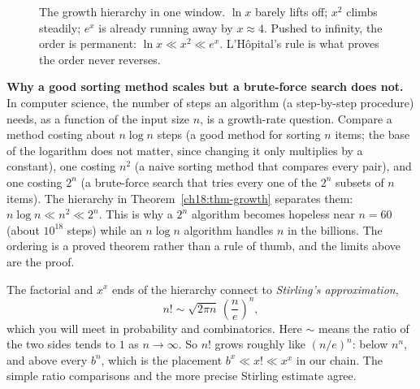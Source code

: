 \begin{figure}[H]
\centering
{}
\caption{The growth hierarchy in one window. $\ln x$ barely lifts off; $x^2$ climbs
steadily; $e^x$ is already running away by $x\approx 4$. Pushed to infinity, the order
is permanent: $\ln x\ll x^2\ll e^x$. L'H\^opital's rule is what proves the order never
reverses.}
\label{ch18:fig-growth}
\end{figure}

\begin{applicationbox}
\textbf{Why a good sorting method scales but a brute-force search does not.} In
computer science, the number of steps an algorithm (a step-by-step procedure) needs,
as a function of the input size $n$, is a growth-rate question. Compare a method costing
about $n\log n$ steps (a good method for sorting $n$ items; the base of the
logarithm does not matter, since changing it only multiplies by a constant), one
costing $n^2$ (a
naive sorting method that compares every pair), and one costing $2^n$ (a brute-force
search that tries every one of the $2^n$ subsets of $n$ items). The hierarchy in
Theorem~\ref{ch18:thm-growth} separates them:
$n\log n\ll n^2\ll 2^n$. This is why a
$2^n$ algorithm becomes hopeless near $n=60$ (about $10^{18}$ steps) while an $n\log n$
algorithm handles $n$ in the billions. The ordering is a proved theorem rather than a
rule of thumb, and the limits above are the proof.
\end{applicationbox}

\begin{connectionbox}
The factorial and $x^x$ ends of the hierarchy connect to \emph{Stirling's
approximation},
\[
n!\sim \sqrt{2\pi n}\,\left(\frac{n}{e}\right)^{n},
\]
which you will meet in probability and combinatorics. Here $\sim$ means the ratio of
the two sides tends to $1$ as $n\to\infty$. So $n!$ grows roughly like $(n/e)^n$:
below $n^n$, and above every $b^n$, which is the placement
$b^x\ll x!\ll x^x$ in our chain. The simple ratio comparisons and the more precise
Stirling estimate agree.
\end{connectionbox}

